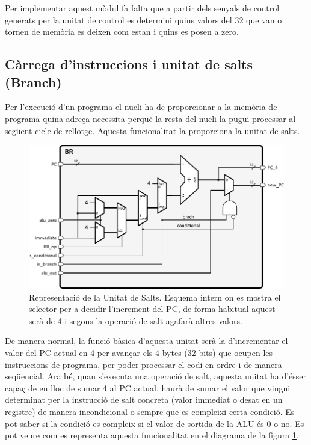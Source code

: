 \documentclass[10pt,a4paper,twocolumn,twoside]{article}
\begin{document}
    Per implementar aquest mòdul fa falta que a partir dels senyals de control generats per la unitat de control es determini quins valors del 32 que van o tornen de memòria es deixen com estan i quins es posen a zero.
    
    \subsection{ Càrrega d'instruccions i unitat de salts (Branch)}%
        Per l'execució d'un programa el nucli ha de proporcionar a la memòria de programa quina adreça necessita perquè la resta del nucli la pugui processar al següent cicle de rellotge. Aquesta funcionalitat la proporciona la unitat de salts. 
    
    \begin{figure}[!ht]
    \centering
    	\includegraphics[width=\linewidth]{pdf/Branch.pdf}
        \caption{Representació de la Unitat de Salts. Esquema intern on es mostra el selector per a decidir l'increment del PC, de forma habitual aquest serà de 4 i segons la operació de salt agafarà altres valors.}
        \label{fig:BR}
    \end{figure}
    
    De manera normal, la funció bàsica d'aquesta unitat serà la d'incrementar el valor del PC actual en 4 per avançar els 4 bytes (32 bits) que ocupen les instruccions de programa, per poder processar el codi en ordre i de manera seqüencial. Ara bé, quan s'executa una operació de salt, aquesta unitat ha d'ésser capaç de en lloc de sumar 4 al PC actual, haurà de sumar el valor que vingui determinat per la instrucció de salt concreta (valor immediat o desat en un registre) de manera incondicional o sempre que es compleixi certa condició. Es pot saber si la condició es compleix si el valor de sortida de la ALU és 0 o no. Es pot veure com es representa aquesta funcionalitat en el diagrama de la figura \ref{fig:BR}.
    
\end{document}
